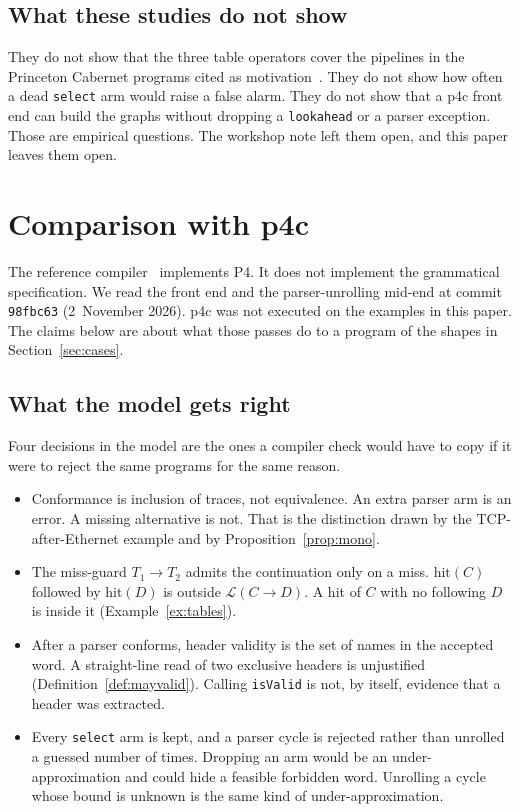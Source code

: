 \documentclass[a4paper,UKenglish,cleveref,autoref]{lipics-v2021}
\begin{document}
\subsection{What these studies do not show}

They do not show that the three table operators cover the pipelines in the Princeton Cabernet programs cited as motivation~\cite{yuan2025fmano}.
They do not show how often a dead \texttt{select} arm would raise a false alarm.
They do not show that a p4c front end can build the graphs without dropping a \texttt{lookahead} or a parser exception.
Those are empirical questions.
The workshop note left them open, and this paper leaves them open.

\section{Comparison with p4c}
\label{sec:p4c}

The reference compiler~\cite{p4c} implements P4.
It does not implement the grammatical specification.
We read the front end and the parser-unrolling mid-end at commit \texttt{98fbc63} (2~November 2026).
p4c was not executed on the examples in this paper.
The claims below are about what those passes do to a program of the shapes in Section~\ref{sec:cases}.

\subsection{What the model gets right}

Four decisions in the model are the ones a compiler check would have to copy if it were to reject the same programs for the same reason.

\begin{itemize}
\item Conformance is inclusion of traces, not equivalence.
  An extra parser arm is an error.
  A missing alternative is not.
  That is the distinction drawn by the TCP-after-Ethernet example and by Proposition~\ref{prop:mono}.
\item The miss-guard \(T_1 \rightarrow T_2\) admits the continuation only on a miss.
  \(\mathrm{hit}(C)\) followed by \(\mathrm{hit}(D)\) is outside \(\mathcal{L}(C \rightarrow D)\).
  A hit of \(C\) with no following \(D\) is inside it (Example~\ref{ex:tables}).
\item After a parser conforms, header validity is the set of names in the accepted word.
  A straight-line read of two exclusive headers is unjustified (Definition~\ref{def:mayvalid}).
  Calling \texttt{isValid} is not, by itself, evidence that a header was extracted.
\item Every \texttt{select} arm is kept, and a parser cycle is rejected rather than unrolled a guessed number of times.
  Dropping an arm would be an under-approximation and could hide a feasible forbidden word.
  Unrolling a cycle whose bound is unknown is the same kind of under-approximation.
\end{itemize}
\end{document}
